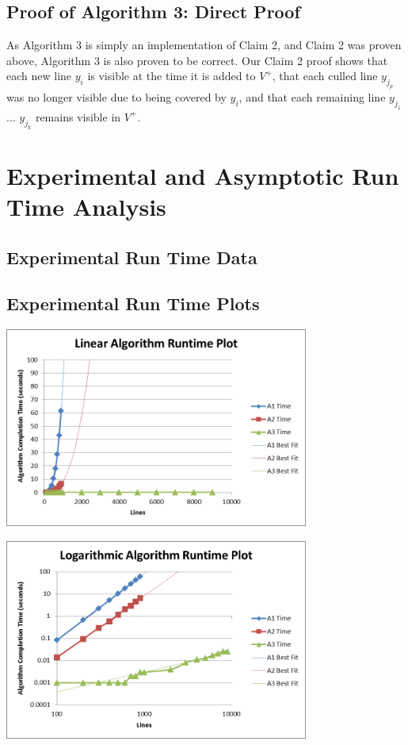 \documentclass{article}
\begin{document}
\subsection*{Proof of Algorithm 3: Direct Proof}
As Algorithm 3 is simply an implementation of Claim 2, and Claim 2 was proven above, Algorithm 3 is also proven to be correct.  Our Claim 2 proof shows that each new line $y_i$ is visible at the time it is added to $V^+$, that each culled line $y_{j_p}$ was no longer visible due to being covered by $y_i$, and that each remaining line $y_{j_1}$ ... $y_{j_k}$ remains visible in $V^+$.

\section*{Experimental and Asymptotic Run Time Analysis}
\subsection*{Experimental Run Time Data}


\pagebreak

\subsection*{Experimental Run Time Plots}
\centerline{\includegraphics[width=0.75\textwidth]{plot1.png}}
\centerline{\includegraphics[width=0.75\textwidth]{plot2.png}}
\end{document}
